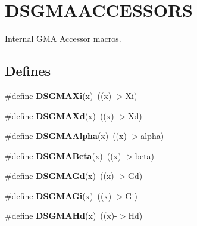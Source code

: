 \hypertarget{group___d_s_g_m_a_a_c_c_e_s_s_o_r_s}{
\section{DSGMAACCESSORS}
\label{group___d_s_g_m_a_a_c_c_e_s_s_o_r_s}
}


Internal GMA Accessor macros.  


\subsection*{Defines}
\begin{DoxyCompactItemize}
\item 
\hypertarget{group___d_s_g_m_a_a_c_c_e_s_s_o_r_s_ga0cab93c0c71055d7f8754aa40f1682a1}{
\#define {\bfseries DSGMAXi}(x)~((x)-\/$>$Xi)}
\label{group___d_s_g_m_a_a_c_c_e_s_s_o_r_s_ga0cab93c0c71055d7f8754aa40f1682a1}

\item 
\hypertarget{group___d_s_g_m_a_a_c_c_e_s_s_o_r_s_ga4bb1751353a0d1ade658ca63bbce72a3}{
\#define {\bfseries DSGMAXd}(x)~((x)-\/$>$Xd)}
\label{group___d_s_g_m_a_a_c_c_e_s_s_o_r_s_ga4bb1751353a0d1ade658ca63bbce72a3}

\item 
\hypertarget{group___d_s_g_m_a_a_c_c_e_s_s_o_r_s_gae873e802262802bde6cb1cb7def4cee9}{
\#define {\bfseries DSGMAAlpha}(x)~((x)-\/$>$alpha)}
\label{group___d_s_g_m_a_a_c_c_e_s_s_o_r_s_gae873e802262802bde6cb1cb7def4cee9}

\item 
\hypertarget{group___d_s_g_m_a_a_c_c_e_s_s_o_r_s_gaa9689d77abe7393f3365cc826ebc9aa9}{
\#define {\bfseries DSGMABeta}(x)~((x)-\/$>$beta)}
\label{group___d_s_g_m_a_a_c_c_e_s_s_o_r_s_gaa9689d77abe7393f3365cc826ebc9aa9}

\item 
\hypertarget{group___d_s_g_m_a_a_c_c_e_s_s_o_r_s_ga27b67a9b7aaf1490793844a0ee6ddd67}{
\#define {\bfseries DSGMAGd}(x)~((x)-\/$>$Gd)}
\label{group___d_s_g_m_a_a_c_c_e_s_s_o_r_s_ga27b67a9b7aaf1490793844a0ee6ddd67}

\item 
\hypertarget{group___d_s_g_m_a_a_c_c_e_s_s_o_r_s_gac0d97e70b8b69c42e303fe30709a97f3}{
\#define {\bfseries DSGMAGi}(x)~((x)-\/$>$Gi)}
\label{group___d_s_g_m_a_a_c_c_e_s_s_o_r_s_gac0d97e70b8b69c42e303fe30709a97f3}

\item 
\hypertarget{group___d_s_g_m_a_a_c_c_e_s_s_o_r_s_ga50b54e96cfe2d1388ef037c7e2d2f3a5}{
\#define {\bfseries DSGMAHd}(x)~((x)-\/$>$Hd)}
\label{group___d_s_g_m_a_a_c_c_e_s_s_o_r_s_ga50b54e96cfe2d1388ef037c7e2d2f3a5}


\end{DoxyCompactItemize}
